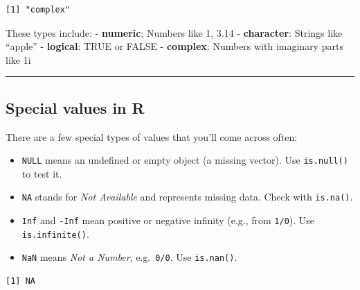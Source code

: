 \documentclass[
  letterpaper,
  DIV=11,
  numbers=noendperiod]{scrartcl}
\newenvironment{Shaded}{\begin{snugshade}}{\end{snugshade}}
\newcommand{\AttributeTok}[1]{\textcolor[rgb]{0.40,0.45,0.13}{#1}}
\newcommand{\CommentTok}[1]{\textcolor[rgb]{0.37,0.37,0.37}{#1}}
\newcommand{\ConstantTok}[1]{\textcolor[rgb]{0.56,0.35,0.01}{#1}}
\newcommand{\DecValTok}[1]{\textcolor[rgb]{0.68,0.00,0.00}{#1}}
\newcommand{\FunctionTok}[1]{\textcolor[rgb]{0.28,0.35,0.67}{#1}}
\newcommand{\NormalTok}[1]{\textcolor[rgb]{0.00,0.23,0.31}{#1}}
\newcommand{\OtherTok}[1]{\textcolor[rgb]{0.00,0.23,0.31}{#1}}
\newcommand{\SpecialCharTok}[1]{\textcolor[rgb]{0.37,0.37,0.37}{#1}}
\providecommand{\tightlist}{%
  \setlength{\itemsep}{0pt}\setlength{\parskip}{0pt}}\usepackage{longtable,booktabs,array}
\begin{document}
\begin{verbatim}
[1] "complex"
\end{verbatim}

These types include: - \textbf{numeric}: Numbers like 1, 3.14 -
\textbf{character}: Strings like ``apple'' - \textbf{logical}: TRUE or
FALSE - \textbf{complex}: Numbers with imaginary parts like 1i

\begin{center}\rule{0.5\linewidth}{0.5pt}\end{center}

\subsection{Special values in R}\label{special-values-in-r}

There are a few special types of values that you'll come across often:

\begin{itemize}
\tightlist
\item
  \texttt{NULL} means an undefined or empty object (a missing vector).
  Use \texttt{is.null()} to test it.
\item
  \texttt{NA} stands for \emph{Not Available} and represents missing
  data. Check with \texttt{is.na()}.
\item
  \texttt{Inf} and \texttt{-Inf} mean positive or negative infinity
  (e.g., from \texttt{1/0}). Use \texttt{is.infinite()}.
\item
  \texttt{NaN} means \emph{Not a Number}, e.g.~\texttt{0/0}. Use
  \texttt{is.nan()}.
\end{itemize}

\begin{Shaded}
\end{Shaded}

\begin{verbatim}
[1] NA
\end{verbatim}
\end{document}
